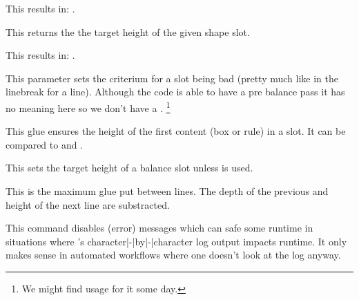 \typebuffer

\start \getbuffer[shape] This results in: {\inlinebuffer}. \stop

\stopnewprimitive

\startnewprimitive[title={\prm {balanceshapevsize}}]

This returns the the target height of the given shape slot.

\startbuffer
\the{} \space
\the{}
\stopbuffer

\typebuffer

\start \getbuffer[shape] This results in: {\inlinebuffer}. \stop

\stopnewprimitive

\startnewprimitive[title={\prm {balancetolerance}}]

This parameter sets the criterium for a slot being bad (pretty much like in the
linebreak for a line). Although the code is able to have a pre balance pass it
has no meaning here so we don't have a \type {\balancepretolerance}. \footnote
{We might find usage for it some day.}

\stopnewprimitive

\startnewprimitive[title={\prm {balancetopskip}}]

This glue ensures the height of the first content (box or rule) in a slot. It can
be compared to  and .

\stopnewprimitive

\startnewprimitive[title={\prm {balancevsize}}]

This sets the target height of a balance slot unless  is used.

\stopnewprimitive

\startoldprimitive[title={\prm {baselineskip}}]

This is the maximum glue put between lines. The depth of the previous and height
of the next line are substracted.

\stopoldprimitive

\startoldprimitive[title={\prm {batchmode}}]

This command disables (error) messages which can safe some runtime in situations
where \TEX's character|-|by|-|character log output impacts runtime. It only makes
sense in automated workflows where one doesn't look at the log anyway.

\stopoldprimitive

\startnewprimitive[title={\prm {begincsname}}]

